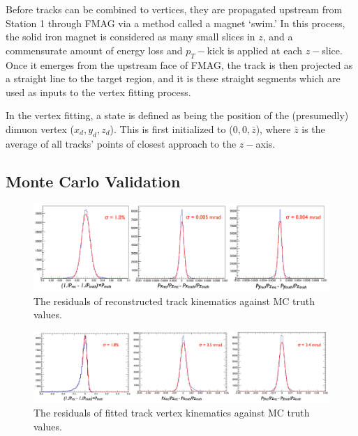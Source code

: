 Before tracks can be combined to vertices, they are propagated upstream from Station 1 through FMAG via a method called a magnet `swim.' In this process, the solid iron magnet is considered as many small slices in $z$, and a commensurate amount of energy loss and $p_T-$kick is applied at each $z-$slice. Once it emerges from the upstream face of FMAG, the track is then projected as a straight line to the target region, and it is these straight segments which are used as inputs to the vertex fitting process.

In the vertex fitting, a state is defined as being the position of the (presumedly) dimuon vertex ($x_d, y_d, z_d$). This is first initialized to ($0, 0, \bar{z}$), where $\bar{z}$ is the average of all tracks' points of closest approach to the $z-$axis.


\subsection{Monte Carlo Validation}

\begin{figure}
	\centering
	\includegraphics[width=\textwidth]{figures/analysis/track-residuals.png} \\
	\caption{The residuals of reconstructed track kinematics against MC truth values.}
	\label{fig:mc-track-validation}
	\vspace{12pt}
	\includegraphics[width=\textwidth]{figures/analysis/dimuon-residuals.png}
	\caption{The residuals of fitted track vertex kinematics against MC truth values.}
	\label{fig:mc-vertex-validation}
\end{figure}


